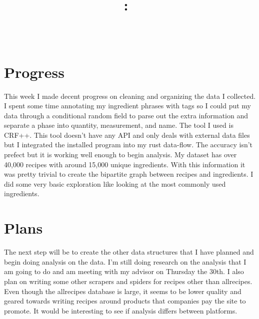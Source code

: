 \documentclass{article}
\title{
    \vspace{2in}
    \textmd{\textbf{\hmwkClass:\ \hmwkTitle}}\\
    \normalsize\vspace{0.1in}\small{\hmwkDueDate}\\
    \vspace{0.1in}\large{\textit{\hmwkClassInstructor}}
    \vspace{3in}
}
\author{\hmwkAuthorName}
\date{}
\begin{document}
\maketitle
\pagebreak

\section{Progress}
This week I made decent progress on cleaning and organizing the data I collected. I spent some time annotating my ingredient phrases with
tags so I could put my data through a conditional random field to parse out the extra information and separate a phase into quantity,
measurement, and name. The tool I used is CRF++. This tool doesn't have any API and only deals with external data files but I integrated the
installed program into my rust data-flow. The accuracy isn't prefect but it is working well enough to begin analysis. My dataset has over 40,000
recipes with around 15,000 unique ingredients. With this information it was pretty trivial to create the bipartite graph between recipes and
ingredients. I did some very basic exploration like looking at the most commonly used ingredients.

\section{Plans}
The next step will be to create the other data structures that I have planned and begin doing analysis on the data. I'm still doing research
on the analysis that I am going to do and am meeting with my advisor on Thursday the 30th. I also plan on writing some other scrapers and spiders
for recipes other than allrecipes. Even though the allrecipes database is large, it seems to be lower quality and geared towards writing
recipes around products that companies pay the site to promote. It would be interesting to see if analysis differs between platforms.
\end{document}
